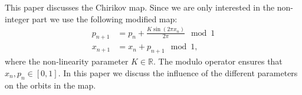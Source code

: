 This paper discusses the Chirikov map. Since we are only interested in the non-integer part we use the following modified map:
\begin{subequations}\label{eq:chirikov}
	\begin{align}
		\label{eq:chirikov:p} p_{n + 1} &= p_n + \frac{K \sin \left(  2 \pi x_n \right)}{2 \pi} \mod 1 \\
		\label{eq:chirikov:x} x_{n + 1} &= x_n + p_{n + 1} \mod 1,
	\end{align}
\end{subequations}	
where the non-linearity parameter $K \in \mathbb{R}$. The modulo operator ensures that $x_n, p_n \in \left[ 0, 1 \right]$. In this paper we discuss the influence of the different parameters on the orbits in the map.